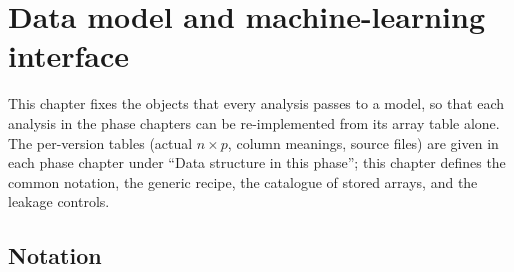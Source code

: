 \chapter{Data model and machine-learning interface}\label{ch:datamodel}

This chapter fixes the objects that every analysis passes to a model, so that each analysis in the phase chapters can be
re-implemented from its array table alone. The per-version tables (actual $n\times p$, column meanings, source files)
are given in each phase chapter under ``Data structure in this phase''; this chapter defines the common notation, the
generic recipe, the catalogue of stored arrays, and the leakage controls.

\section{Notation}\label{sec:dm-notation}

